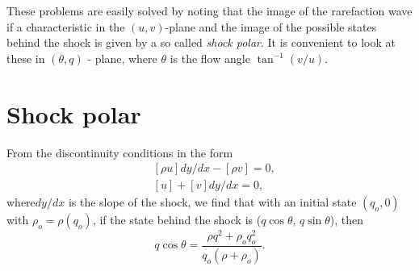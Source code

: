 These problems are easily solved by noting that the image of the rarefaction wave if a characteristic in the $(u,v)$-plane and the image of the possible states behind the shock is given by a so called {\em shock polar}. It is convenient to look at these in $(\theta ,q)$ - plane, where $\theta$ is the flow angle $\tan^{-1}(v/u)$.

\section{Shock polar}\label{chap3:sec3.4}
From the discontinuity conditions in the form 
\begin{align*}
& [\rho u] dy / dx - [\rho v] = 0, \\
& [u] + [v] dy/ dx = 0,
\end{align*}
where\pageoriginale $dy/dx$ is the slope of the shock, we find that with an initial state $(q_o, 0)$ with $\rho_o = \rho (q_o)$, if the state behind the shock is ($q \cos \theta$, $q \sin \theta$), then
\begin{equation*}
q \cos \theta = \frac{\rho q^2 + \rho_o q^2_o}{q_o (\rho + \rho_o)}.
\tag{3.12}\label{eq3.12}
\end{equation*}

